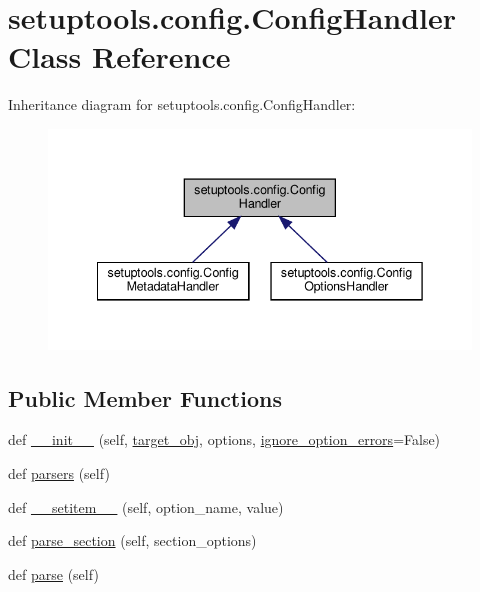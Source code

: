 \hypertarget{classsetuptools_1_1config_1_1ConfigHandler}{}\section{setuptools.\+config.\+Config\+Handler Class Reference}
\label{classsetuptools_1_1config_1_1ConfigHandler}


Inheritance diagram for setuptools.\+config.\+Config\+Handler\+:
\nopagebreak
\begin{figure}[H]
\begin{center}
\leavevmode
\includegraphics[width=342pt]{classsetuptools_1_1config_1_1ConfigHandler__inherit__graph}
\end{center}
\end{figure}
\subsection*{Public Member Functions}
\begin{DoxyCompactItemize}
\item 
def \hyperlink{classsetuptools_1_1config_1_1ConfigHandler_a00d3fc6e1c42f5e46490a423b4d124b6}{\+\_\+\+\_\+init\+\_\+\+\_\+} (self, \hyperlink{classsetuptools_1_1config_1_1ConfigHandler_aa932a185c0e0fd1d98ebc8bceb88b153}{target\+\_\+obj}, options, \hyperlink{classsetuptools_1_1config_1_1ConfigHandler_a5d64dedea13caaf606cde29c6aac8d97}{ignore\+\_\+option\+\_\+errors}=False)
\item 
def \hyperlink{classsetuptools_1_1config_1_1ConfigHandler_aae6195fe85e3caf2da8bf0b41644e234}{parsers} (self)
\item 
def \hyperlink{classsetuptools_1_1config_1_1ConfigHandler_a972a9b2d1f6a6782ad900b58a63092d5}{\+\_\+\+\_\+setitem\+\_\+\+\_\+} (self, option\+\_\+name, value)
\item 
def \hyperlink{classsetuptools_1_1config_1_1ConfigHandler_a253ac8a3585f40218d2e09d3243ade5b}{parse\+\_\+section} (self, section\+\_\+options)
\item 
def \hyperlink{classsetuptools_1_1config_1_1ConfigHandler_afdcabf01520d6e9a99ebf893b8422f17}{parse} (self)
\end{DoxyCompactItemize}
